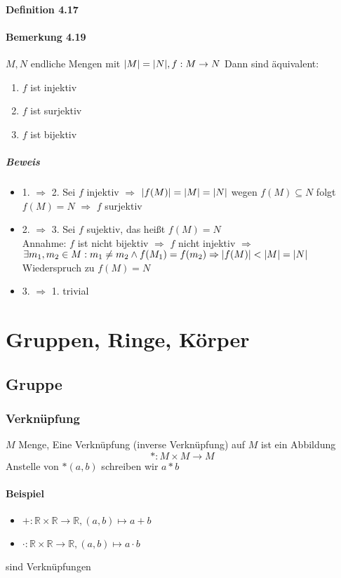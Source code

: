 \documentclass[a4paper]{scrartcl}
\DeclarePairedDelimiter\abs{\lvert}{\rvert}%
\theoremstyle{definition}
\theoremstyle{plain}
\theoremstyle{plain}
\theoremstyle{remark}
\theoremstyle{remark}
\theoremstyle{remark}
\begin{document}
\paragraph{Definition 4.17}
\label{sec-2-6-7-9}
\paragraph{Bemerkung 4.19}
\label{sec-2-6-7-10}
$M,N$ endliche Mengen mit $\abs{M} = \abs{N},f:M\to N$ Dann sind äquivalent:
\begin{enumerate}
\item $f$ ist injektiv
\item $f$ ist surjektiv
\item $f$ ist bijektiv
\end{enumerate}
\subparagraph{Beweis}
\label{sec-2-6-7-10-1}
\begin{itemize}
\item 1. $\Rightarrow$ 2. Sei $f$ injektiv $\Rightarrow$ $\abs{f(M)} = \abs{M} = \abs{N}$ wegen $f(M) \subseteq N$ folgt $f(M) = N$ $\Rightarrow$ $f$ surjektiv
\item 2. $\Rightarrow$ 3. Sei $f$ sujektiv, das heißt $f(M) = N$ \\
        Annahme: $f$ ist nicht bijektiv $\Rightarrow$ $f$ nicht injektiv $\Rightarrow$ $\exists m_1,m_2\in M: m_1\neq m_2 \wedge f(M_1) = f(m_2) \Rightarrow \abs{f(M)} < \abs{M} = \abs{N}$ Wiederspruch zu $f(M) = N$
\item 3. $\Rightarrow$ 1. trivial
\end{itemize}
\section{Gruppen, Ringe, Körper}
\label{sec-3}
\subsection{Gruppe}
\label{sec-3-1}
\subsubsection{Verknüpfung}
\label{sec-3-1-1}
$M$ Menge, Eine Verknüpfung (inverse Verknüpfung) auf $M$ ist ein Abbildung \[*:M\times M \to M\]
Anstelle von $*(a,b)$ schreiben wir $a * b$
\paragraph{Beispiel}
\label{sec-3-1-1-1}
\begin{itemize}
\item $+: \mathbb{R} \times \mathbb{R} \to \mathbb{R},(a,b) \mapsto a + b$
\item $\cdot: \mathbb{R} \times \mathbb{R} \to \mathbb{R},(a,b) \mapsto a\cdot b$
\end{itemize}
sind Verknüpfungen
\end{document}
